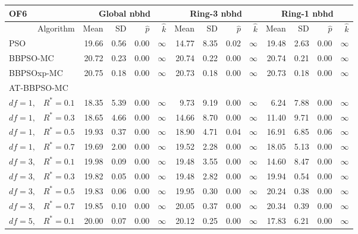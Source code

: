 \documentclass[cmbright]{staauth}
\begin{document}
\begin{table}[ht]
\centering
\tiny{
\begin{tabular}{r|rrrr|rrrr|rrrr}
\multicolumn{1}{l}{OF6} & \multicolumn{4}{c}{Global nbhd} & \multicolumn{4}{c}{Ring-3 nbhd} & \multicolumn{4}{c}{Ring-1 nbhd}\\
  \hline
Algorithm & Mean & SD & $\widehat{p}$ & $\widehat{k}$ & Mean & SD & $\widehat{p}$ & $\widehat{k}$ & Mean & SD & $\widehat{p}$ & $\widehat{k}$ \\
  \hline
\multicolumn{1}{l|}{PSO} & 19.66 & 0.56 & 0.00 & $\infty$ & 14.77 & 8.35 & 0.02 & $\infty$ & 19.48 & 2.63 & 0.00 & $\infty$ \\
  \multicolumn{1}{l|}{BBPSO-MC} & 20.72 & 0.23 & 0.00 & $\infty$ & 20.74 & 0.22 & 0.00 & $\infty$ & 20.74 & 0.21 & 0.00 & $\infty$ \\
  \multicolumn{1}{l|}{BBPSOxp-MC} & 20.75 & 0.18 & 0.00 & $\infty$ & 20.73 & 0.18 & 0.00 & $\infty$ & 20.73 & 0.18 & 0.00 & $\infty$ \\
\hline
\multicolumn{1}{l|}{AT-BBPSO-MC} &&&&&&&&&&&&\\
  $df = 1,\enspace$ $R^* =0.1$ & 18.35 & 5.39 & 0.00 & $\infty$ & 9.73 & 9.19 & 0.00 & $\infty$ & 6.24 & 7.88 & 0.00 & $\infty$ \\
  $df = 1,\enspace$ $R^* =0.3$ & 18.65 & 4.66 & 0.00 & $\infty$ & 14.66 & 8.70 & 0.00 & $\infty$ & 11.40 & 9.71 & 0.00 & $\infty$ \\
  $df = 1,\enspace$ $R^* =0.5$ & 19.93 & 0.37 & 0.00 & $\infty$ & 18.90 & 4.71 & 0.04 & $\infty$ & 16.91 & 6.85 & 0.06 & $\infty$ \\
  $df = 1,\enspace$ $R^* =0.7$ & 19.69 & 2.00 & 0.00 & $\infty$ & 19.52 & 2.28 & 0.00 & $\infty$ & 18.05 & 5.13 & 0.00 & $\infty$ \\
  $df = 3,\enspace$ $R^* =0.1$ & 19.98 & 0.09 & 0.00 & $\infty$ & 19.48 & 3.55 & 0.00 & $\infty$ & 14.60 & 8.47 & 0.00 & $\infty$ \\
  $df = 3,\enspace$ $R^* =0.3$ & 19.82 & 0.05 & 0.00 & $\infty$ & 19.48 & 2.82 & 0.00 & $\infty$ & 19.94 & 0.54 & 0.00 & $\infty$ \\
  $df = 3,\enspace$ $R^* =0.5$ & 19.83 & 0.06 & 0.00 & $\infty$ & 19.95 & 0.30 & 0.00 & $\infty$ & 20.24 & 0.38 & 0.00 & $\infty$ \\
  $df = 3,\enspace$ $R^* =0.7$ & 19.85 & 0.10 & 0.00 & $\infty$ & 20.05 & 0.37 & 0.00 & $\infty$ & 20.34 & 0.39 & 0.00 & $\infty$ \\
  $df = 5,\enspace$ $R^* =0.1$ & 20.00 & 0.07 & 0.00 & $\infty$ & 20.12 & 0.25 & 0.00 & $\infty$ & 17.83 & 6.21 & 0.00 & $\infty$ \\

\end{tabular}}
\end{table}
\end{document}
